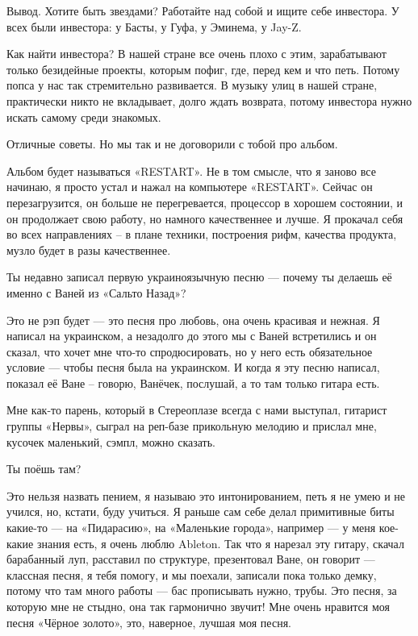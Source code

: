 Вывод. Хотите быть звездами? Работайте над собой и ищите себе инвестора. У всех
были инвестора: у Басты, у Гуфа, у Эминема, у Jay-Z.

Как найти инвестора? В нашей стране все очень плохо с этим, зарабатывают только
безидейные проекты, которым пофиг, где, перед кем и что петь. Потому попса у
нас так стремительно развивается. В музыку улиц в нашей стране, практически
никто не вкладывает, долго ждать возврата, потому инвестора нужно искать самому
среди знакомых.

Отличные советы. Но мы так и не договорили с тобой про альбом.

Альбом будет называться «RESTART». Не в том смысле, что я заново все начинаю, я
просто устал и нажал на компьютере «RESTART». Сейчас он перезагрузится, он
больше не перегревается, процессор в хорошем состоянии, и он продолжает свою
работу, но намного качественнее и лучше. Я прокачал себя во всех направлениях –
в плане техники, построения рифм, качества продукта, музло будет в разы
качественнее.

Ты недавно записал первую украиноязычную песню --- почему ты делаешь её именно с
Ваней из «Сальто Назад»?

Это не рэп будет --- это песня про любовь, она очень красивая и нежная. Я написал
на украинском, а незадолго до этого мы с Ваней встретились и он сказал, что
хочет мне что-то спродюсировать, но у него есть обязательное условие --- чтобы
песня была на украинском. И когда я эту песню написал, показал её Ване –
говорю, Ванёчек, послушай, а то там только гитара есть.  

Мне как-то парень, который в Стереоплазе всегда с нами выступал, гитарист
группы «Нервы», сыграл на реп-базе прикольную мелодию и прислал мне, кусочек
маленький, сэмпл, можно сказать.

Ты поёшь там?

Это нельзя назвать пением, я называю это интонированием, петь я не умею и не
учился, но, кстати, буду учиться. Я раньше сам себе делал примитивные биты
какие-то --- на «Пидарасию», на «Маленькие города», например --- у меня кое-какие
знания есть, я очень люблю Ableton. Так что я нарезал эту гитару,  скачал
барабанный луп, расставил по структуре, презентовал Ване, он говорит --- классная
песня, я тебя помогу, и мы поехали, записали пока только демку, потому что там
много работы --- бас прописывать нужно, трубы. Это песня, за которую мне не
стыдно, она так гармонично звучит! Мне очень нравится моя песня «Чёрное
золото», это, наверное, лучшая моя песня.

